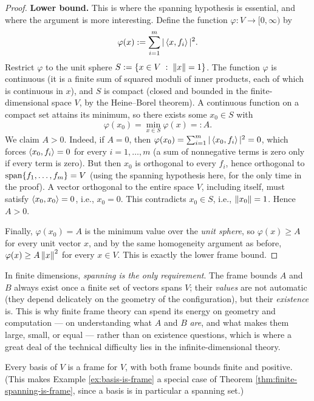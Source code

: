 \begin{proof}
\textbf{Lower bound.} This is where the spanning hypothesis is essential, and where the argument is more interesting. Define the function $\varphi : V \to [0, \infty)$ by
$$
\varphi(x) := \sum_{i=1}^m |\left\langle x, f_i \right\rangle|^2.
$$
Restrict $\varphi$ to the unit sphere $S := \left\{ x \in V \;:\; \left\| x \right\| = 1 \right\}$. The function $\varphi$ is continuous (it is a finite sum of squared moduli of inner products, each of which is continuous in $x$), and $S$ is compact (closed and bounded in the finite-dimensional space $V$, by the Heine--Borel theorem). A continuous function on a compact set attains its minimum, so there exists some $x_0 \in S$ with
$$
\varphi(x_0) = \min_{x \in S} \varphi(x) =: A.
$$
We claim $A > 0$. Indeed, if $A = 0$, then $\varphi(x_0) = \sum_{i=1}^m |\left\langle x_0, f_i \right\rangle|^2 = 0$, which forces $\left\langle x_0, f_i \right\rangle = 0$ for every $i = 1, \dots, m$ (a sum of nonnegative terms is zero only if every term is zero). But then $x_0$ is orthogonal to every $f_i$, hence orthogonal to $\operatorname{span}\{f_1, \dots, f_m\} = V$ (using the spanning hypothesis here, for the only time in the proof). A vector orthogonal to the entire space $V$, including itself, must satisfy $\left\langle x_0, x_0 \right\rangle = 0$, i.e., $x_0 = 0$. This contradicts $x_0 \in S$, i.e., $\left\| x_0 \right\| = 1$. Hence $A > 0$.

Finally, $\varphi(x_0) = A$ is the minimum value over the \emph{unit sphere}, so $\varphi(x) \ge A$ for every unit vector $x$, and by the same homogeneity argument as before, $\varphi(x) \ge A\left\| x \right\|^2$ for every $x \in V$. This is exactly the lower frame bound.
\end{proof}

\begin{keyidea}
In finite dimensions, \emph{spanning is the only requirement}. The frame bounds $A$ and $B$ always exist once a finite set of vectors spans $V$; their \emph{values} are not automatic (they depend delicately on the geometry of the configuration), but their \emph{existence} is. This is why finite frame theory can spend its energy on geometry and computation --- on understanding what $A$ and $B$ \emph{are}, and what makes them large, small, or equal --- rather than on existence questions, which is where a great deal of the technical difficulty lies in the infinite-dimensional theory.
\end{keyidea}

\begin{corollary}
\label{cor:any-basis-frame}
Every basis of $V$ is a frame for $V$, with both frame bounds finite and positive. (This makes Example \ref{ex:basis-is-frame} a special case of Theorem \ref{thm:finite-spanning-is-frame}, since a basis is in particular a spanning set.)
\end{corollary}

